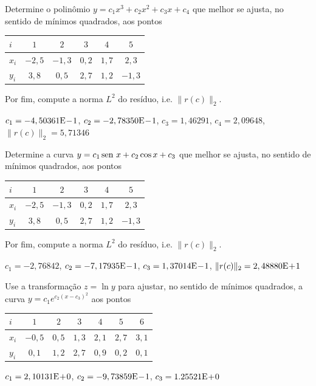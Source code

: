 \begin{exer}\label{exer:mq_poli}
  Determine o polinômio $y = c_1x^3 + c_2x^2 + c_3x + c_4$ que melhor se ajusta, no sentido de mínimos quadrados, aos pontos
  \begin{center}
    \begin{tabular}{l|ccccc}
      $i$ & $1$ & $2$ & $3$ & $4$ & $5$ \\\hline
      $x_i$ & $-2,5$ & $-1,3$ & $0,2$ & $1,7$ & $2,3$\\
      $y_i$ & $3,8$ & $0,5$ & $2,7$ & $1,2$ & $-1,3$\\\hline
    \end{tabular}
  \end{center}
Por fim, compute a norma $L^2$ do resíduo, i.e. $\|r(c)\|_2$.
\end{exer}
\begin{resp}
  $c_1 = -4,50361\mathrm{E}\!-\!1$, $c_2 = -2,78350\mathrm{E}\!-\!1$, $c_3 = 1,46291$, $c_4 = 2,09648$, $\|r(c)\|_2 = 5,71346$
\end{resp}

\begin{exer}\label{exer:mq_curva}
  Determine a curva $y = c_1\operatorname{sen}\, x + c_2\cos x + c_3$ que melhor se ajusta, no sentido de mínimos quadrados, aos pontos
  \begin{center}
    \begin{tabular}{l|ccccc}
      $i$ & $1$ & $2$ & $3$ & $4$ & $5$ \\\hline
      $x_i$ & $-2,5$ & $-1,3$ & $0,2$ & $1,7$ & $2,3$\\
      $y_i$ & $3,8$ & $0,5$ & $2,7$ & $1,2$ & $-1,3$\\\hline
    \end{tabular}
  \end{center}
Por fim, compute a norma $L^2$ do resíduo, i.e. $\|r(c)\|_2$.
\end{exer}
\begin{resp}
  $c_1 = -2,76842$, $c_2 = -7,17935\mathrm{E}\!-\!1$, $c_3 = 1,37014\mathrm{E}\!-\!1$, $\|r(c)\|_2 = 2,48880\mathrm{E}\!+\!1$
\end{resp}

\begin{exer}\label{exer:mq_nlin0}
  Use a transformação $z = \ln y$ para ajustar, no sentido de mínimos quadrados, a curva $y = c_1e^{c_2(x-c_3)^2}$ aos pontos
  \begin{center}
    \begin{tabular}{l|cccccc}
      $i$ & $1$ & $2$ & $3$ & $4$ & $5$ & $6$ \\\hline
      $x_i$ & $-0,5$ & $0,5$ & $1,3$ & $2,1$ & $2,7$ & $3,1$ \\
      $y_i$ & $0,1$ & $1,2$ & $2,7$ & $0,9$ & $0,2$ & $0,1$ \\\hline
    \end{tabular}
  \end{center}
\end{exer}
\begin{resp}
  $c_1 = 2,10131\mathrm{E}\!+\!0$, $c_2 = -9,73859\mathrm{E}\!-\!1$, $c_3 = 1.25521\mathrm{E}\!+\!0$
\end{resp}
   
